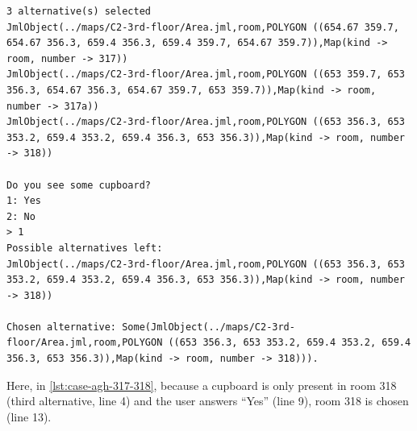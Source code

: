 \begin{lstlisting}[label={lst:case-agh-317-318},caption={Mediation between rooms 317, 317a, and 318.}]
3 alternative(s) selected
JmlObject(../maps/C2-3rd-floor/Area.jml,room,POLYGON ((654.67 359.7, 654.67 356.3, 659.4 356.3, 659.4 359.7, 654.67 359.7)),Map(kind -> room, number -> 317))
JmlObject(../maps/C2-3rd-floor/Area.jml,room,POLYGON ((653 359.7, 653 356.3, 654.67 356.3, 654.67 359.7, 653 359.7)),Map(kind -> room, number -> 317a))
JmlObject(../maps/C2-3rd-floor/Area.jml,room,POLYGON ((653 356.3, 653 353.2, 659.4 353.2, 659.4 356.3, 653 356.3)),Map(kind -> room, number -> 318))

Do you see some cupboard?
1: Yes
2: No
> 1
Possible alternatives left:
JmlObject(../maps/C2-3rd-floor/Area.jml,room,POLYGON ((653 356.3, 653 353.2, 659.4 353.2, 659.4 356.3, 653 356.3)),Map(kind -> room, number -> 318))

Chosen alternative: Some(JmlObject(../maps/C2-3rd-floor/Area.jml,room,POLYGON ((653 356.3, 653 353.2, 659.4 353.2, 659.4 356.3, 653 356.3)),Map(kind -> room, number -> 318))).
\end{lstlisting}

Here, in \cref{lst:case-agh-317-318}, because a cupboard is only present in room 318 (third alternative, line 4) and the user answers ``Yes'' (line 9), room 318 is chosen (line 13).

